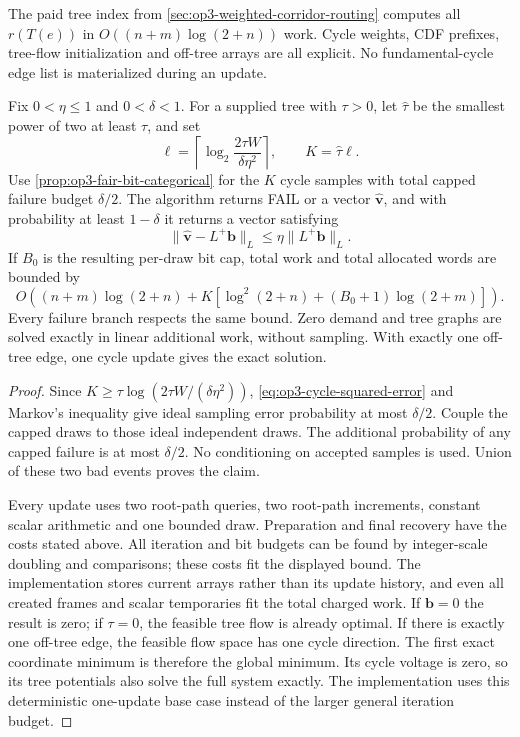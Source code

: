 The paid tree index from \cref{sec:op3-weighted-corridor-routing}
computes all $r(T(e))$ in $O((n+m)\log(2+n))$ work. Cycle weights,
CDF prefixes, tree-flow initialization and off-tree arrays are all
explicit. No fundamental-cycle edge list is materialized during an update.

\begin{theorem}
\label{thm:op3-paid-cycle-solve}
Fix $0<\eta\leq1$ and $0<\delta<1$. For a supplied tree with $\tau>0$,
let $\widehat\tau$ be the smallest power of two at least $\tau$, and set
\[
 \ell=\left\lceil\log_2\frac{2\tau W}{\delta\eta^2}\right\rceil,
 \qquad K=\widehat\tau\ell.
\]
Use \cref{prop:op3-fair-bit-categorical} for the $K$ cycle samples with
total capped failure budget $\delta/2$. The algorithm returns
\textnormal{FAIL} or a vector $\widehat{\bm v}$, and with probability
at least $1-\delta$ it returns a vector satisfying
\[
 \|\widehat{\bm v}-L^+\bm b\|_L\leq\eta\|L^+\bm b\|_L.
\]
If $B_0$ is the resulting per-draw bit cap, total work and total
allocated words are bounded by
\[
 O\!\left((n+m)\log(2+n)
 +K\left[\log^2(2+n)+(B_0+1)\log(2+m)\right]\right).
\]
Every failure branch respects the same bound. Zero demand and tree
graphs are solved exactly in linear additional work, without sampling.
With exactly one off-tree edge, one cycle update gives the exact solution.
\end{theorem}
\begin{proof}
Since $K\geq\tau\log(2\tau W/(\delta\eta^2))$,
\cref{eq:op3-cycle-squared-error} and Markov's inequality give ideal
sampling error probability at most $\delta/2$. Couple the capped draws
to those ideal independent draws. The additional probability of any
capped failure is at most $\delta/2$. No conditioning on accepted
samples is used. Union of these two bad events proves the claim.

Every update uses two root-path queries, two root-path increments,
constant scalar arithmetic and one bounded draw. Preparation and final
recovery have the costs stated above. All iteration and bit budgets can
be found by integer-scale doubling and comparisons; these costs fit
the displayed bound. The implementation stores current arrays rather
than its update history, and even all created frames and scalar
temporaries fit the total charged work. If $\bm b=0$ the result is
zero; if $\tau=0$, the feasible tree flow is already optimal.
If there is exactly one off-tree edge, the feasible flow space has one
cycle direction. The first exact coordinate minimum is therefore the
global minimum. Its cycle voltage is zero, so its tree potentials also
solve the full system exactly. The implementation uses this deterministic
one-update base case instead of the larger general iteration budget.
\end{proof}

